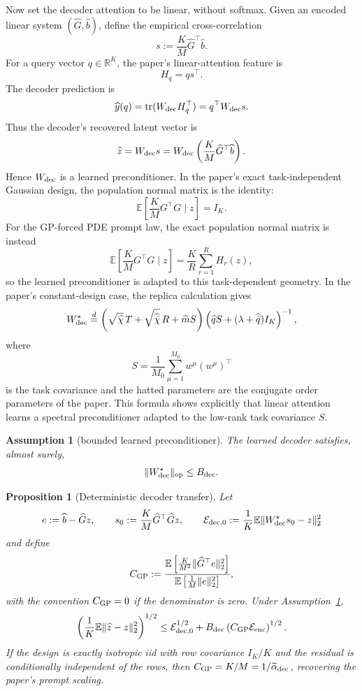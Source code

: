 \documentclass[11pt,a4paper]{article}
\newtheorem{assumption}{Assumption}
\newtheorem{proposition}{Proposition}
\theoremstyle{definition}
\newcommand{\R}{\mathbb R}
\newcommand{\E}{\mathbb E}
\newcommand{\op}{\mathrm{op}}
\newcommand{\wh}{\widehat}
\newcommand{\calE}{\mathcal E}
\newcommand{\tr}{\operatorname{tr}}
\begin{document}
Now set the decoder attention to be linear, without softmax.  Given an encoded
linear system $(\wh G,\wh b)$, define the empirical cross-correlation
\[
    s
    :=
    \frac{K}{M}\wh G^\top\wh b .
\]
For a query vector $q\in\R^K$, the paper's linear-attention feature is
\[
    H_q
    =
    q s^\top .
\]
The decoder prediction is
\[
    \wh y(q)
    =
    \tr(W_{\rm dec}H_q^\top)
    =
    q^\top W_{\rm dec}s .
\]
Thus the decoder's recovered latent vector is
\[
    \wh z=W_{\rm dec}s
    =
    W_{\rm dec}
    \left(\frac{K}{M}\wh G^\top\wh b\right).
\]
Hence $W_{\rm dec}$ is a learned preconditioner.  In the paper's exact
task-independent Gaussian design, the population normal matrix is the identity:
\[
    \E\left[\frac{K}{M}G^\top G\mid z\right]=I_K.
\]
For the GP-forced PDE prompt law, the exact population normal matrix is instead
\[
    \E\left[\frac{K}{M}G^\top G\mid z\right]
    =
    \frac{K}{R}\sum_{r=1}^{R}H_r(z),
\]
so the learned preconditioner is adapted to this task-dependent geometry.  In
the paper's constant-design case, the replica calculation gives
\[
    W_{\rm dec}^{\star}
    \overset{d}{=}
    \left(
        \sqrt{\wh\chi}\,T+
        \sqrt{\wh{\bar\chi}}\,R+
        \wh m S
    \right)
    \left(
        \wh q S+(\lambda+\wh{\bar q})I_K
    \right)^{-1},
\]
where
\[
    S=\frac1{M_0}\sum_{\mu=1}^{M_0}w^\mu(w^\mu)^\top
\]
is the task covariance and the hatted parameters are the conjugate order
parameters of the paper.  This formula shows explicitly that linear attention
learns a spectral preconditioner adapted to the low-rank task covariance $S$.

\begin{assumption}[bounded learned preconditioner]
\label{ass:boundedprec}
The learned decoder satisfies, almost surely,
\[
    \|W_{\rm dec}^{\star}\|_{\op}\le B_{\rm dec}.
\]
\end{assumption}

\begin{proposition}[Deterministic decoder transfer]
\label{prop:decoder}
Let
\[
    e:=\wh b-\wh Gz,
    \qquad
    s_0:=\frac K M\wh G^\top\wh Gz,
    \qquad
    \calE_{\rm dec,0}:=\frac1K\E\|W_{\rm dec}^\star s_0-z\|_2^2
\]
and define
\[
    C_{\rm GP}
    :=
    \frac{
    \E\left[
        \frac{K}{M^2}\|\wh G^\top e\|_2^2
    \right]}
    {
    \E\left[
        \frac1M\|e\|_2^2
    \right]
    },
\]
with the convention $C_{\rm GP}=0$ if the denominator is zero.  Under
Assumption~\ref{ass:boundedprec},
\[
    \left(\frac1K\E\|\wh z-z\|_2^2\right)^{1/2}
    \le
    \calE_{\rm dec,0}^{1/2}
    +B_{\rm dec}\left(C_{\rm GP}\calE_{\rm enc}\right)^{1/2}.
    \label{eq:decoder-minkowski}
\]
If the design is exactly isotropic iid with row covariance $I_K/K$ and the
residual is conditionally independent of the rows, then
$C_{\rm GP}=K/M=1/\widetilde\alpha_{\rm dec}$, recovering the paper's prompt
scaling.
\end{proposition}
\end{document}
